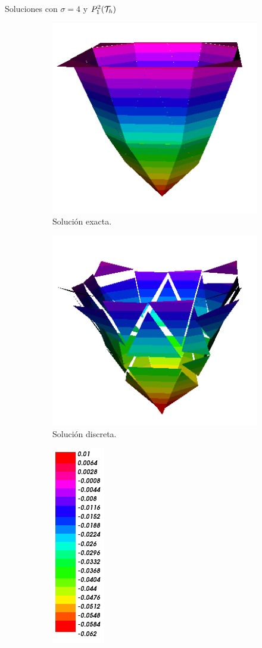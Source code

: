 	\begin{frame}{Soluciones con $\sigma=4$ y $\relax{P}^2_1(\mathcal{T}_h)$}
		\begin{figure}[h!]
			\begin{subfigure}[b]{0.215\textwidth}
				\centering
				\includegraphics[scale=0.16]{img/Difusion/Recortes/steady_diffusion_exact_n_4.png}
				\caption{Solución exacta.}
			\end{subfigure}
			\begin{subfigure}[b]{0.215\textwidth}
				\centering
				\includegraphics[scale=0.16]{img/Difusion/Recortes/steady_diffusion_approx_n_4.png}
				\caption{Solución discreta.}
			\end{subfigure}
			\begin{subfigure}[b]{0.11\textwidth}
				\centering
				\includegraphics[scale=0.23]{img/Difusion/Recortes/steady_diffusion_values.png}

\end{subfigure}
\end{figure}
\end{frame}
